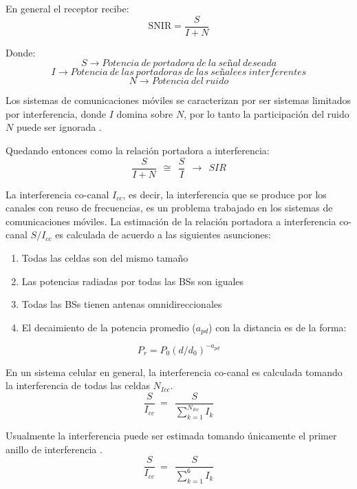 En general el receptor recibe:\newline
\begin{equation}
\mathrm{SNIR=}\frac{S}{I+N}
\label{eqn:SNIR}
\end{equation}

Donde:
\[S\to Potencia\ de\ portadora\ de\ la\ se\textrm{\~{n}}al\ deseada\] 
\[I\to Potencia\ de\ las\ portadoras\ de\ las\ se\textrm{\~{n}}alees\ interferentes\] 
\[N\to Potencia\ del\ ruido\] 

Los sistemas de comunicaciones móviles se caracterizan por ser sistemas limitados por interferencia, donde $I$ domina sobre $N$, por lo tanto la participación del ruido $N$ puede ser ignorada \parencite{Correia2018}.\newline

Quedando entonces como la relación portadora a interferencia:\newline
\begin{equation}
\frac{S}{I+N}\ \ \cong \ \ \frac{S}{I}\ \ \to \ \ SIR
\label{eqn:SIR}
\end{equation}

La interferencia co-canal $I_{cc}$, es decir, la interferencia que se produce por los canales con reuso de frecuencias, es un problema trabajado en los sistemas de comunicaciones móviles. La estimación de la relación portadora a interferencia co-canal ${S}/{I_{cc}}$ es calculada de acuerdo  a las siguientes asunciones:

\begin{enumerate}
\item  Todas las celdas son del mismo tamaño
\item  Las potencias radiadas por todas las BSs son iguales
\item  Todas las BSs tienen antenas omnidireccionales
\item  El decaimiento de la potencia promedio ($a_{pd}$) con la distancia es de la forma:
\end{enumerate}
\begin{equation}
P_r=P_0{(d/d_0)}^{-a_{pd}} 
\label{eqn:P_r}
\end{equation}

En un sistema celular en general, la interferencia co-canal es calculada tomando la interferencia de todas las celdas $N_{Icc}$.
\begin{equation}
\frac{S}{I_{cc}}\ =\ \ \frac{S}{\sum^{N_{Icc}}_{k=1}{I_k}} 
\label{eqn:Icc}
\end{equation}

Usualmente la interferencia puede ser estimada tomando únicamente el primer anillo de interferencia \parencite{Correia2018}.
\begin{equation}
\frac{S}{I_{cc}}\ =\ \ \frac{S}{\sum^6_{k=1}{I_k}} 
\label{eqn:I}
\end{equation}

